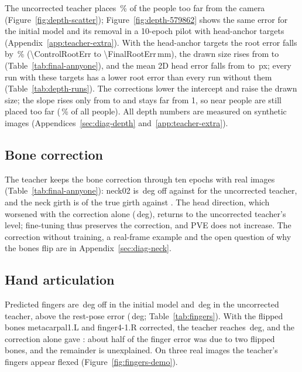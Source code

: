 The uncorrected teacher places \ControlTooFarPct\,\% of the people too far from the camera
(Figure~\ref{fig:depth-scatter}); Figure~\ref{fig:depth-579862} shows the same error for the initial model and its
removal in a 10-epoch pilot with head-anchor targets (Appendix~\ref{app:teacher-extra}). With the head-anchor targets the root error falls by \RootErrDropPct\,\%
(\num{\ControlRootErr} to \num{\FinalRootErr}\,mm), the drawn size rises from \ControlSize{} to \FinalSize{}
(Table~\ref{tab:final-annyone}), and the mean 2D head error falls from \ControlHeadPx{} to \FinalHeadPx\,px; every
run with these targets has a lower root error than every run without them (Table~\ref{tab:depth-runs}). The
corrections lower the intercept and raise the drawn size; the slope rises only from \ControlSlope{} to \FinalSlope{}
and stays far from 1, so near people are still placed too far (\FinalTooFarPct\,\% of all people). All depth numbers
are measured on synthetic images
(Appendices~\ref{sec:diag-depth} and~\ref{app:teacher-extra}).

\subsection{Bone correction}
\label{sec:res-bone}

The teacher keeps the bone correction through ten epochs with real images (Table~\ref{tab:final-annyone}): neck02
is \FinalNeckTwo\,deg off against \ControlNeckTwo{} for the uncorrected teacher, and the neck girth is \FinalGirth{}
of the true girth against \ControlGirth. The head direction, which worsened with the correction alone
(\NoTrainHeadDir\,deg), returns to the uncorrected teacher's level; fine-tuning thus preserves the correction, and
PVE does not increase. The correction without training, a real-frame example and the open question of why the bones
flip are in Appendix~\ref{sec:diag-neck}.

\subsection{Hand articulation}
\label{sec:res-fingers}

Predicted fingers are \BaseFingers\,deg off in the initial model and \ControlFingers\,deg in the uncorrected teacher,
above the rest-pose error (\BaseFingersRest\,deg; Table~\ref{tab:fingers}). With the flipped bones metacarpal1.L and
finger4-1.R corrected, the teacher reaches \FinalFingers\,deg, and the correction alone gave \NoTrainFingers: about
half of the finger error was due to two flipped bones, and the remainder is unexplained. On three real images the
teacher's fingers appear flexed (Figure~\ref{fig:fingers-demo}).


